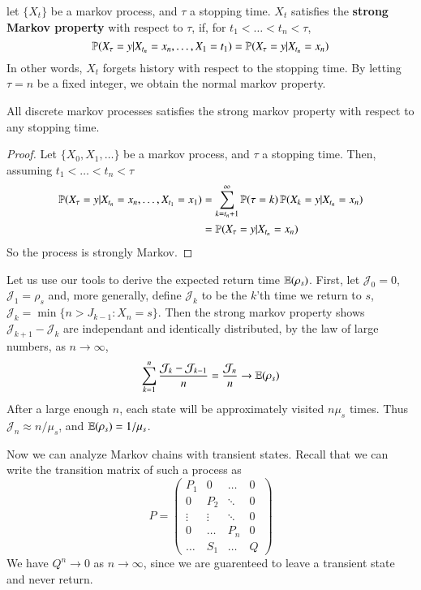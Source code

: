 \begin{definition}
    let $\{ X_t \}$ be a markov process, and $\tau$ a stopping time. $X_t$ satisfies the {\bf strong Markov property} with respect to $\tau$, if, for $t_1 < \dots < t_n < \tau$,
    \[ \operatorname{\mathbb{P}}(X_\tau = y | X_{t_n} = x_n, \dots, X_1 = t_1) = \operatorname{\mathbb{P}}(X_\tau = y | X_{t_n} = x_n) \]
    In other words, $X_t$ forgets history with respect to the stopping time. By letting $\tau = n$ be a fixed integer, we obtain the normal markov property.
\end{definition}

\begin{theorem}
    All discrete markov processes satisfies the strong markov property with respect to any stopping time.
\end{theorem}
\begin{proof}
    Let $\{ X_0, X_1, \dots \}$ be a markov process, and $\tau$ a stopping time. Then, assuming $t_1 < \dots < t_n < \tau$
    \begin{align*}
        \operatorname{\mathbb{P}}(X_\tau = y | X_{t_n} = x_n, \dots, X_{t_1} = x_1) &= \sum_{k = t_n + 1}^\infty \operatorname{\mathbb{P}}(\tau = k) \operatorname{\mathbb{P}}(X_k = y | X_{t_n} = x_n)\\
        &= \operatorname{\mathbb{P}}(X_\tau = y | X_{t_n} = x_n)
    \end{align*}
    So the process is strongly Markov.
\end{proof}

Let us use our tools to derive the expected return time $\operatorname{\mathbb{E}}(\rho_s)$. First, let $\mathcal{J}_0 = 0$, $\mathcal{J}_1 = \rho_s$ and, more generally, define $\mathcal{J}_k$ to be the $k$'th time we return to $s$, $\mathcal{J}_k = \min \{ n > J_{k-1} : X_n = s \}$. Then the strong markov property shows $\mathcal{J}_{k+1} - \mathcal{J}_k$ are independant and identically distributed, by the law of large numbers, as $n \to \infty$,
%
\[ \sum_{k = 1}^n \frac{\mathcal{J}_k - \mathcal{J}_{k-1}}{n} = \frac{\mathcal{J}_n}{n} \to \operatorname{\mathbb{E}}(\rho_s) \]
%
After a large enough $n$, each state will be approximately visited $n \mu_s$ times. Thus $\mathcal{J}_n \approx n/\mu_s$, and $\operatorname{\mathbb{E}}(\rho_s) = 1/\mu_s$.

Now we can analyze Markov chains with transient states. Recall that we can write the transition matrix of such a process as
%
\[ P = \begin{pmatrix} P_1 & 0 & \dots & 0 \\ 0 & P_2 & \ddots & 0 \\ \vdots & \vdots & \ddots & 0 \\ 0 & \dots & P_n & 0 \\ \dots & S_1 & \dots & Q \end{pmatrix} \]
%
We have $Q^n \to 0$ as $n \to \infty$, since we are guarenteed to leave a transient state and never return.

